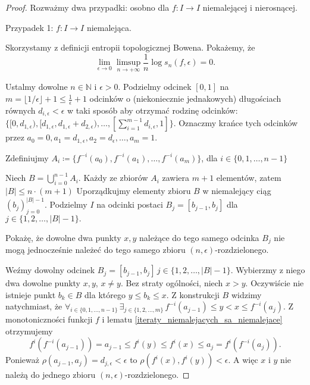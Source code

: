 \documentclass[licencjacka]{pwr_wmat_praca_dyplomowa}
\theoremstyle{plain}
\numberwithin{theorem}{chapter}
\theoremstyle{definition}
\numberwithin{theorem}{chapter}
\begin{document}
\begin{proof}
Rozważmy dwa przypadki: osobno dla $f: I \rightarrow I$ niemalejącej i nierosnącej.
\item[Przypadek 1: $f: I \rightarrow I$ niemalejąca.]

Skorzystamy z definicji entropii topologicznej Bowena. Pokażemy, że 
$$\lim_{\epsilon \rightarrow 0} \limsup_{n \rightarrow +\infty} \frac{1}{n} \log s_n(f, \epsilon) = 0.$$


Ustalmy dowolne $n \in \mathbb{N}$ i $\epsilon > 0.$ Podzielmy odcinek $[0, 1]$ na $m = \lfloor 1/\epsilon \rfloor + 1 \leq \frac{1}{\epsilon} + 1$ odcinków o (niekoniecznie jednakowych) długościach równych $d_{i,\epsilon} < \epsilon$ w taki sposób aby otrzymać rodzinę odcinków: $\{ [0, d_{1,\epsilon}), [d_{1,\epsilon}, d_{1,\epsilon} + d_{2, \epsilon}), \ldots, [\sum_{i=1}^{m-1} d_{i, \epsilon}, 1] \}.$ Oznaczmy krańce tych odcinków przez $a_0=0, a_1 = d_{1,\epsilon}, a_2 = d_{\epsilon}, \ldots, a_m = 1.$ 

Zdefiniujmy $A_i \coloneqq \{f^{-i}(a_0), f^{-i}(a_1), \ldots, f^{-i}(a_m)\}$, dla $i \in \{0, 1, \ldots, n-1\}$

Niech $B = \bigcup_{i=0}^{n-1} A_i.$ Każdy ze zbiorów $A_i$ zawiera $m+1$ elementów, zatem $|B| \leq n \cdot (m+1)$ Uporządkujmy elementy zbioru $B$ w niemalejący ciąg $(b_j)_{j=0}^{|B|-1}.$ Podzielmy $I$ na odcinki postaci $B_j = [b_{j-1}, b_{j}]$ dla $j \in \{1, 2, \ldots, |B|-1\}.$  

Pokażę, że dowolne dwa punkty $x, y$ należące do tego samego odcinka $B_j$ nie mogą jednocześnie należeć do tego samego zbioru $(n, \epsilon)$-rozdzielonego.

Weźmy dowolny odcinek $B_j = [b_{j-1}, b_{j}] \, j \in \{1, 2, \ldots, |B|-1\}.$ Wybierzmy z niego dwa dowolne punkty $x, y$, $x \neq y$. Bez straty ogólności, niech $x > y.$ Oczywiście nie istnieje punkt $b_k \in B$ dla którego $y \leq b_k \leq x.$ Z konstrukcji $B$ widzimy natychmiast, że $\forall_{i \in \{0, 1, \ldots, n-1\}} \, \exists_{j \in \{1,2,\ldots,m\}} \, f^{-i}(a_{j-1}) \leq y < x \leq f^{-i}(a_j)$. Z monotoniczności funkcji $f$ i lematu \ref{iteraty_niemalejacych_sa_niemalejace} otrzymujemy 
$$f^i(f^{-i}(a_{j-1})) =  a_{j-1} \leq f^i(y) \leq f^i(x) \leq a_j = f^i(f^{-i}(a_j)).$$
Ponieważ $\rho(a_{j-1}, a_j) = d_{j,\epsilon} < \epsilon$ to  $\rho(f^i(x), f^i(y)) < \epsilon.$ A więc $x$ i $y$ nie należą do jednego zbioru $(n, \epsilon)$-rozdzielonego.




\end{proof}
\end{document}
